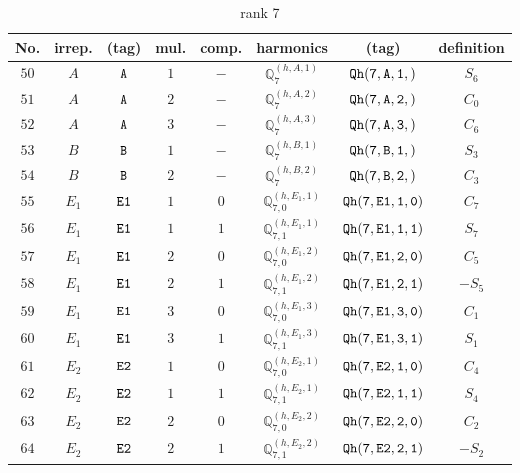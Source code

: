 \documentclass[fleqn,8pt]{jsarticle}
\begin{document}
\begin{table}[ht!]
\begin{center}
\caption{rank 7}
\renewcommand{\arraystretch}{1.3}
\begin{tabular}{cccccccc} \hline \hline
No. & irrep. & (tag) & mul. & comp. & harmonics & (tag) & definition \\ \hline
$ 50 $ & $ A $ & $ {\tt A} $ & $ 1 $ & $ - $ & $ \mathbb{Q}_{7}^{(h,A,1)} $ & $ {\tt Qh(7,A,1,)} $ & $ S_{6} $ \\
$ 51 $ & $ A $ & $ {\tt A} $ & $ 2 $ & $ - $ & $ \mathbb{Q}_{7}^{(h,A,2)} $ & $ {\tt Qh(7,A,2,)} $ & $ C_{0} $ \\
$ 52 $ & $ A $ & $ {\tt A} $ & $ 3 $ & $ - $ & $ \mathbb{Q}_{7}^{(h,A,3)} $ & $ {\tt Qh(7,A,3,)} $ & $ C_{6} $ \\
$ 53 $ & $ B $ & $ {\tt B} $ & $ 1 $ & $ - $ & $ \mathbb{Q}_{7}^{(h,B,1)} $ & $ {\tt Qh(7,B,1,)} $ & $ S_{3} $ \\
$ 54 $ & $ B $ & $ {\tt B} $ & $ 2 $ & $ - $ & $ \mathbb{Q}_{7}^{(h,B,2)} $ & $ {\tt Qh(7,B,2,)} $ & $ C_{3} $ \\
$ 55 $ & $ E_{1} $ & $ {\tt E1} $ & $ 1 $ & $ 0 $ & $ \mathbb{Q}_{7,0}^{(h,E_{1},1)} $ & $ {\tt Qh(7,E1,1,0)} $ & $ C_{7} $ \\
$ 56 $ & $ E_{1} $ & $ {\tt E1} $ & $ 1 $ & $ 1 $ & $ \mathbb{Q}_{7,1}^{(h,E_{1},1)} $ & $ {\tt Qh(7,E1,1,1)} $ & $ S_{7} $ \\
$ 57 $ & $ E_{1} $ & $ {\tt E1} $ & $ 2 $ & $ 0 $ & $ \mathbb{Q}_{7,0}^{(h,E_{1},2)} $ & $ {\tt Qh(7,E1,2,0)} $ & $ C_{5} $ \\
$ 58 $ & $ E_{1} $ & $ {\tt E1} $ & $ 2 $ & $ 1 $ & $ \mathbb{Q}_{7,1}^{(h,E_{1},2)} $ & $ {\tt Qh(7,E1,2,1)} $ & $ - S_{5} $ \\
$ 59 $ & $ E_{1} $ & $ {\tt E1} $ & $ 3 $ & $ 0 $ & $ \mathbb{Q}_{7,0}^{(h,E_{1},3)} $ & $ {\tt Qh(7,E1,3,0)} $ & $ C_{1} $ \\
$ 60 $ & $ E_{1} $ & $ {\tt E1} $ & $ 3 $ & $ 1 $ & $ \mathbb{Q}_{7,1}^{(h,E_{1},3)} $ & $ {\tt Qh(7,E1,3,1)} $ & $ S_{1} $ \\
$ 61 $ & $ E_{2} $ & $ {\tt E2} $ & $ 1 $ & $ 0 $ & $ \mathbb{Q}_{7,0}^{(h,E_{2},1)} $ & $ {\tt Qh(7,E2,1,0)} $ & $ C_{4} $ \\
$ 62 $ & $ E_{2} $ & $ {\tt E2} $ & $ 1 $ & $ 1 $ & $ \mathbb{Q}_{7,1}^{(h,E_{2},1)} $ & $ {\tt Qh(7,E2,1,1)} $ & $ S_{4} $ \\
$ 63 $ & $ E_{2} $ & $ {\tt E2} $ & $ 2 $ & $ 0 $ & $ \mathbb{Q}_{7,0}^{(h,E_{2},2)} $ & $ {\tt Qh(7,E2,2,0)} $ & $ C_{2} $ \\
$ 64 $ & $ E_{2} $ & $ {\tt E2} $ & $ 2 $ & $ 1 $ & $ \mathbb{Q}_{7,1}^{(h,E_{2},2)} $ & $ {\tt Qh(7,E2,2,1)} $ & $ - S_{2} $ \\
 \hline \hline
\end{tabular}
\end{center}
\end{table}
\end{document}
